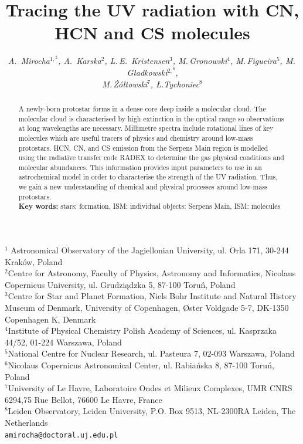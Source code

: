 \documentclass[a4paper]{article}
\begin{document}
\fontsize{11}{11}\selectfont %
\title{Tracing the UV radiation with CN, HCN and CS molecules}
\author{\textsl{A.~Mirocha$^{1,}^{2}$, A.~Karska$^{2}$, L.\,E.~Kristensen$^{3}$, M.\,Gronowski$^{4}$, M.\,Figueira$^{5}$, M.\, Gładkowski$^{2,}^{6}$}, \\ \textsl{M.\,Żółtowski$^{7}$, Ł.Tychoniec$^{8}$}}
\date{\vspace*{-6ex}}
\maketitle
\begin{center} {\small $^{1}$ Astronomical Observatory of the Jagiellonian University, ul. Orla 171, 30-244 Kraków, Poland\\
$^{2}$Centre for Astronomy, Faculty of Physics, Astronomy and Informatics, Nicolaus Copernicus University, ul. Grudziądzka 5, 87-100 Toruń, Poland\\
$^{3}$Centre for Star and Planet Formation, Niels Bohr Institute and Natural History Museum of Denmark, University of Copenhagen, Øster Voldgade 5-7, DK-1350 Copenhagen K, Denmark\\
$^{4}$Institute of Physical Chemistry Polish Academy of Sciences, ul. Kasprzaka 44/52, 01-224 Warszawa, Poland\\
$^{5}$National Centre for Nuclear Research, ul. Pasteura 7, 02-093 Warszawa, Poland\\
$^{6}$Nicolaus Copernicus Astronomical Center, ul. Rabiańska 8, 87-100 Toruń, Poland\\
$^{7}$University of Le Havre, Laboratoire Ondes et Milieux Complexes, UMR CNRS 6294,75 Rue Bellot, 76600 Le Havre, France\\
$^{8}$Leiden Observatory, Leiden University, P.O. Box 9513, NL-2300RA Leiden, The Netherlands\\
{\tt amirocha@doctoral.uj.edu.pl}}
\end{center}

\begin{abstract}
A newly-born protostar forms in a dense core deep inside a molecular cloud. The molecular cloud is characterised by high extinction in the optical range so observations at long wavelengths are necessary. Millimetre spectra include rotational lines of key molecules which are useful tracers of physics and chemistry around low-mass protostars. HCN, CN, and CS emission from the Serpens Main region is modelled using the radiative transfer code RADEX to determine the gas physical conditions and molecular abundances. This information provides input parameters to use in an astrochemical model in order to characterise the strength of the UV radiation. Thus, we gain a new understanding of chemical and physical processes around low-mass protostars.\\[1ex]
{\bf Key words:} stars: formation, ISM: individual objects: Serpens Main, ISM: molecules
\end{abstract}
\end{document}
